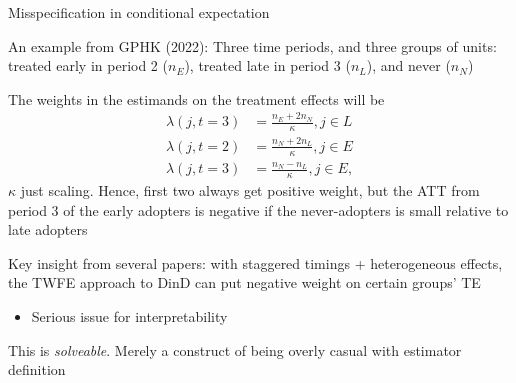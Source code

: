 \documentclass[notes,11pt, aspectratio=169]{beamer}
\newenvironment{wideitemize}{\itemize\addtolength{\itemsep}{10pt}}{\enditemize}
\begin{document}
\begin{frame}{Misspecification in conditional expectation}
	\begin{wideitemize}
		\item An example from GPHK (2022): Three time periods, and three
		groups of units: treated early in period 2 ($n_{E}$), treated late in period 3
		($n_{L}$), and never ($n_{N}$)
		\item The weights in the estimands on the treatment effects will be
		\begin{align}
			\lambda(j,t=3) & = \frac{n_{E} + 2n_{N}}{\kappa}, j \in L \\
			\lambda(j,t=2) & = \frac{n_{N} + 2n_{L}}{\kappa}, j \in E \\
			\lambda(j,t=3) & = \frac{n_{N} - n_{L}}{\kappa}, j \in E,
		\end{align}
		$\kappa$ just scaling. Hence, first two always get positive weight, but the ATT from period 3 of the early adopters is negative if the never-adopters is small relative to late adopters
		\item Key insight from several papers: with staggered timings +
		heterogeneous effects, the TWFE approach to DinD can put negative
		weight on certain groups' TE
		\begin{itemize}
			\item Serious issue for interpretability
		\end{itemize}
		\item This is \emph{solveable}. Merely a construct of being overly
		casual with estimator definition
	\end{wideitemize}
\end{frame}
\end{document}
